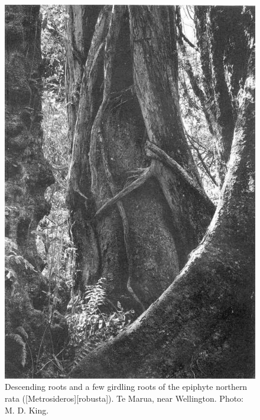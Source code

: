 \begin{figure}[!htb]
	\centering
	\begin{minipage}[t]{0.53\textwidth}
		\centering
		\includegraphics[width=\textwidth]{graphics/figure50rata.jpg}
    	\caption[Descending roots and a few girdling roots of the epiphyte northern rata]{Descending roots and a few girdling roots of the epiphyte northern rata ([Metrosideros][robusta]).
        Te Marua, near Wellington.
    	Photo: M. D. King.}%
    	\label{fig:50rata}
	\end{minipage}\hfill%
	\begin{minipage}[t]{0.45\textwidth}
    	\centering

\end{minipage}
\end{figure}
